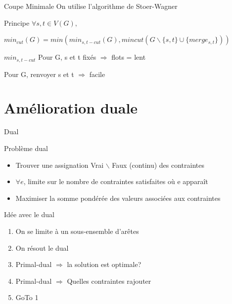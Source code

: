 \documentclass{beamer}
\begin{document}
\begin{frame}{Coupe Minimale}
On utilise l'algorithme de Stoer-Wagner

\begin{block}{Principe}
$\forall s,t \in V(G),$

$min_{cut}(G) = min (min_{s,t-cut}(G), mincut (G \backslash \{s , t\} \cup \{ merge_{s,t} \}))$

\end{block}

\begin{block}{$min_{s,t-cut}$}
\color{red} Pour G, s et t fixés $\Rightarrow$ flots = lent

\color{green} Pour G, renvoyer s et t $\Rightarrow$ facile 
\end{block}
\end{frame}

\section{Amélioration duale}
\begin{frame}{Dual}
\begin{block}{Problème dual}
\begin{itemize}
\item Trouver une assignation Vrai $\backslash$ Faux (continu) des contraintes

\item $\forall e$, limite sur le nombre de contraintes satisfaites où e apparaît

\item Maximiser la somme pondérée des valeurs associées aux contraintes
\end{itemize}
\end{block}
\end{frame}

\begin{frame}{Idée avec le dual}
\begin{enumerate}
\item On se limite à un sous-ensemble d'arêtes
\item On résout le dual
\item Primal-dual $\Rightarrow$ la solution est optimale?
\item Primal-dual $\Rightarrow$ Quelles contraintes rajouter
\item GoTo 1
\end{enumerate}
\end{frame}
\end{document}
